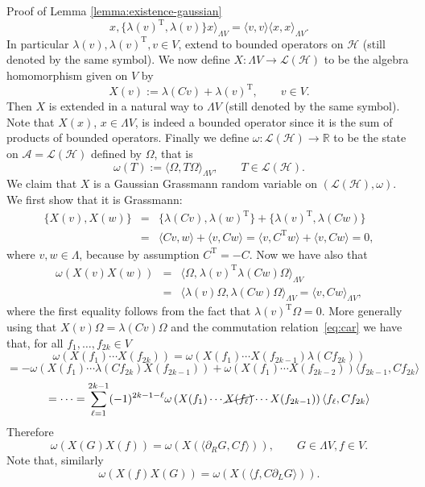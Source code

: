 \documentclass{article}
\newcommand{\Tau}{\mathrm{T}}
\newcommand{\assign}{:=}
\newenvironment{proof*}[1]{\noindent\textbf{#1\ }}{\hspace*{\fill}$\Box$\medskip}
\newcommand{\slashgen}[1]{\cancel{#1}}
\begin{document}
\begin{proof*}{Proof of Lemma \ref{lemma:existence-gaussian}}
\[     x, \{ \lambda (v)^{\Tau}, \lambda (v) \} x \rangle_{\Lambda V} = \langle
     v, v \rangle \langle x, x \rangle_{\Lambda V} . \]
  In particular $\lambda (v), \lambda (v)^{\Tau}, v \in V$, extend to bounded
  operators on $\mathcal{H}$ (still denoted by the same symbol). We now define
  $X : \Lambda V \rightarrow \mathcal{L} (\mathcal{H})$ to be the algebra
  homomorphism given on $V$ by
  \[ X (v) \assign \lambda (C v) + \lambda (v)^{\Tau}, \qquad v \in V. \]
  Then $X$ is extended in a natural way to $\Lambda V$ (still denoted by the
  same symbol). Note that $X (x)$, $x \in \Lambda V$, is indeed a bounded
  operator since it is the sum of products of bounded operators. Finally we
  define $\omega : \mathcal{L} (\mathcal{H}) \rightarrow \mathbb{R}$ to be the
  state on $\mathcal{A} =\mathcal{L} (\mathcal{H})$ defined by $\Omega$, that
  is
  \[ \omega (T) \assign \langle \Omega, T \Omega \rangle_{\Lambda V}, \qquad T
     \in \mathcal{L} (\mathcal{H}) . \]
  We claim that $X$ is a Gaussian Grassmann random variable on $(\mathcal{L}
  (\mathcal{H}), \omega)$. We first show that it is Grassmann:
  \[ \begin{array}{lll}
       \{ X (v), X (w) \} & = & \{ \lambda (C v), \lambda (w)^{\Tau} \} + \{
       \lambda (v)^{\Tau}, \lambda (C w) \}\\
       & = & \langle C v, w \rangle + \langle v, C w \rangle = \langle v,
       C^{\Tau} w \rangle + \langle v, C w \rangle = 0,
     \end{array} \]
  where $v, w \in \Lambda$, because by assumption $C^{\Tau} = - C$. Now we
  have also that
  \begin{eqnarray*}
    \omega (X (v) X (w)) & = & \langle \Omega,^{} \lambda (v)^{\Tau} \lambda
    (C w) \Omega \rangle_{\Lambda V}\\
    & = & \langle \lambda (v) \Omega, \lambda (C w) \Omega \rangle_{\Lambda
    V} = \langle v, C w \rangle_{\Lambda V},
  \end{eqnarray*}
  where the first equality follows from the fact that $\lambda (v)^{\Tau}
  \Omega = 0$. More generally using that $X (v) \Omega = \lambda (C v) \Omega$
  and the commutation relation~{\eqref{eq:car}} we have that, for all $f_1,
  \ldots, f_{2 k} \in V$
  \[ \omega (X (f_1) \cdots X (f_{2 k})) = \omega (X (f_1) \cdots X (f_{2 k -
     1}) \lambda (C f_{2 k})) \]
  \[ = - \omega (X (f_1) \cdots \lambda (C f_{2 k}) X (f_{2 k - 1})) + \omega
     (X (f_1) \cdots X (f_{2 k - 2})) \langle f_{2 k - 1}, C f_{2 k} \rangle
  \]
  \[ = \cdots = \sum_{\ell = 1}^{2 k - 1} (- 1)^{2 k - 1 - \ell} \omega \left(
     X (f_1) \cdots \slashgen{X (f_{\ell})} \cdots X (f_{2 k - 1}) \right)
     \langle f_{\ell}, C f_{2 k} \rangle \]
  Therefore
  \[ \omega (X (G) X (f)) = \omega (X (\langle \partial_R G, C f \rangle)),
     \qquad G \in \Lambda V, f \in V. \]
  Note that, similarly
  \begin{equation}
    \omega (X (f) X (G)) = \omega (X (\langle f, C \partial_L G \rangle)) .
    \label{eq:ibp-l}
  \end{equation}
  
\end{proof*}
\end{document}
